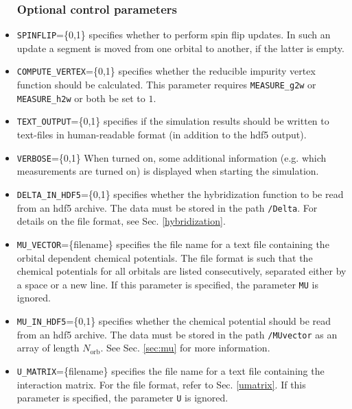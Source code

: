 \documentclass[aps,prb,floatfix,superscriptaddress,twocolumn,notitlepage]{revtex4-1}
\begin{document}
\begin{itemize}
\subsubsection{Optional control parameters}

\item \verb#SPINFLIP#=\{0,1\} specifies whether to perform spin flip updates. In such an update a segment is moved from one orbital to another, if the latter is empty.

\item \verb#COMPUTE_VERTEX#=\{0,1\} specifies whether the reducible impurity vertex function should be calculated. This parameter requires \verb#MEASURE_g2w# or \verb#MEASURE_h2w# or both be set to $1$.

\item \verb#TEXT_OUTPUT#=\{0,1\} specifies if the simulation results should be written to text-files in human-readable format (in addition to the hdf5 output).

\item \verb#VERBOSE#=\{0,1\} When turned on, some additional information (e.g. which measurements are turned on) is displayed when starting the simulation.

\item \verb#DELTA_IN_HDF5#=\{0,1\} specifies whether the hybridization function to be read from an hdf5 archive. The data must be stored in the path \verb#/Delta#. For details on the file format, see Sec. \ref{hybridization}.

\item\verb#MU_VECTOR#=\{filename\} specifies the file name for a text file containing the orbital dependent chemical potentials. The file format is such that the chemical potentials for all orbitals are listed consecutively, separated either by a space or a new line. If this parameter is specified, the parameter \verb#MU# is ignored.

\item\verb#MU_IN_HDF5#=\{0,1\} specifies whether the chemical potential should be read from an hdf5 archive. The data must be stored in the path \verb#/MUvector# as an array of length $N_{\text{orb}}$. See Sec. \ref{sec:mu} for more information.

\item\verb#U_MATRIX#=\{filename\} specifies the file name for a text file containing the interaction matrix. For the file format, refer to Sec. \ref{umatrix}. If this parameter is specified, the parameter \verb#U# is ignored.


\end{itemize}
\end{document}
